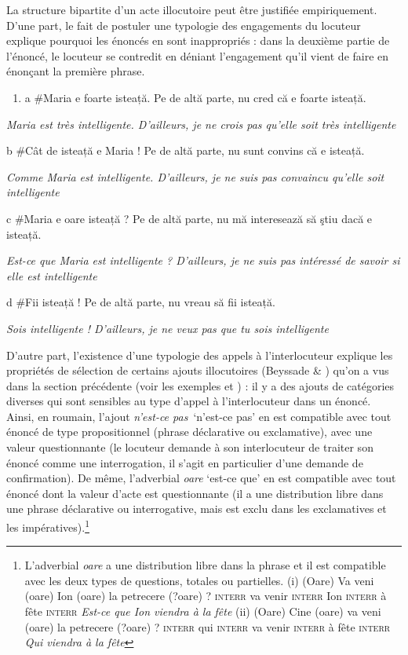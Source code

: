 La structure bipartite d'un acte illocutoire peut être justifiée empiriquement. D'une part, le fait de postuler une typologie des engagements du locuteur explique pourquoi les énoncés en  sont inappropriés : dans la deuxième partie de l'énoncé, le locuteur se contredit en déniant l'engagement qu'il vient de faire en énonçant la première phrase.


\begin{enumerate}
\item \label{bkm:Ref299275188}a  \#Maria e foarte isteață. Pe de altă parte, nu cred că e foarte isteață.


\end{enumerate}
{\itshape
Maria est très intelligente. D'ailleurs, je ne crois pas qu'elle soit très intelligente}

  b  \#Cât de isteață e Maria ! Pe de altă parte, nu sunt convins că e isteață.

{\itshape
Comme Maria est intelligente. D'ailleurs, je ne suis pas convaincu qu'elle soit intelligente}

  c  \#Maria e oare isteață ? Pe de altă parte, nu mă interesează să ştiu dacă e isteață.

{\itshape
Est-ce que Maria est intelligente ? D'ailleurs, je ne suis pas intéressé de savoir si elle est intelligente} 

  d  \#Fii isteață ! Pe de altă parte, nu vreau să fii isteață.

{\itshape
Sois intelligente ! D'ailleurs, je ne veux pas que tu sois intelligente}

D'autre part, l'existence d'une typologie des appels à l'interlocuteur explique les propriétés de sélection de certains ajouts illocutoires (Beyssade \& \citet{Marandin2006}) qu'on a vus dans la section précédente (voir les exemples  et ) : il y a des ajouts de catégories diverses qui sont sensibles au type d'appel à l'interlocuteur dans un énoncé. Ainsi, en roumain, l'ajout \textit{n'est-ce pas}~`n'est-ce pas' en  est compatible avec tout énoncé de type propositionnel (phrase déclarative ou exclamative), avec une valeur questionnante (le locuteur demande à son interlocuteur de traiter son énoncé comme une interrogation, il s'agit en particulier d'une demande de confirmation). De même, l'adverbial \textit{oare} `est-ce que' en  est compatible avec tout énoncé dont la valeur d'acte est questionnante (il a une distribution libre dans une phrase déclarative ou interrogative, mais est exclu dans les exclamatives et les impératives).\footnote{L'adverbial \textit{oare} a une distribution libre dans la phrase et il est compatible avec les deux types de questions, totales ou partielles.
(i)  (Oare)  Va  veni  (oare)  Ion  (oare)  la  petrecere  (?oare) ?
  \textsc{interr}  va  venir  \textsc{interr}  Ion  \textsc{interr}  à  fête  \textsc{interr}
  \textit{Est-ce que Ion viendra à la fête}
(ii)  (Oare)  Cine  (oare)  va veni  (oare)  la  petrecere  (?oare) ?
  \textsc{interr}  qui  \textsc{interr}  va venir  \textsc{interr}  à  fête  \textsc{interr}
\textsc{ } \textit{Qui viendra à la fête}}


